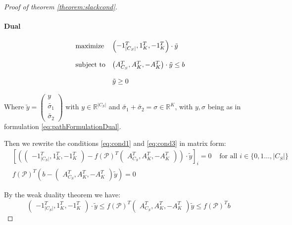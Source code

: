\documentclass[14pt,a4paper]{article}
\theoremstyle{definition}
\numberwithin{equation}{subsection}
\begin{document}
\begin{proof}[Proof of theorem \ref{theorem:slackcond}]
 

 
 \paragraph{Dual}
 \begin{equation}
 \begin{array}{ll@{}ll}
 \text{maximize}  &\left( \begin{matrix} -1_{|C_S|}^T, 1_K^T, -1_K^T  \end{matrix} \right)\cdot \tilde{y}   \\
 \\
 \text{subject to} 
 &\left( \begin{matrix} A_{C_S}^T, A_K^T, -A_K^T \end{matrix} \right) \cdot \tilde{y} \leq  b  \\
 \\
 &\tilde{y} \geq 0
 \end{array}
 \label{eq:matrixformdual}
 \end{equation}
 
 Where $\tilde{y} =\left( \begin{matrix} y \\ \tilde{\sigma_1} \\ \tilde{\sigma_2}  \end{matrix} \right) $ with $y \in \mathbb{R}^{|C_S|}$  and $\tilde{\sigma_1} + \tilde{\sigma_2} = \sigma \in \mathbb{R}^{K}$, with $y,\sigma$ being as in formulation \eqref{eq:pathFormulationDual}.

 
 Then we rewrite the conditions \eqref{eq:cond1} and \eqref{eq:cond3} in matrix form:
\begin{align*}
&\left[ \left( \left( \begin{matrix} -1_{|C_S|}^T, 1_K^T, -1_K^T  \end{matrix} \right) - f(\mathcal{P})^T\left( \begin{matrix} A_{C_S}^T, A_K^T, -A_K^T \end{matrix} \right) \right) \cdot \tilde{y}\right]_{i}= 0 & \text{ for all } i \in \{0,1\ldots,|C_S| \}\\
& f(\mathcal{P})^T\left( b - \left( \begin{matrix} A_{C_S}^T, A_K^T, -A_K^T \end{matrix} \right)\tilde{y} \right) = 0 &
\end{align*}
 
 
 By the weak duality theorem we have: 
 $$\left( \begin{matrix} -1_{|C_S|}^T, 1_K^T, -1_K^T  \end{matrix} \right)\cdot \tilde{y} \leq  
 f(\mathcal{P})^T \left( \begin{matrix} A_{C_S}^T, A_K^T, -A_K^T \end{matrix} \right)\tilde{y} \leq f(\mathcal{P})^Tb $$
 

\end{proof}
\end{document}
